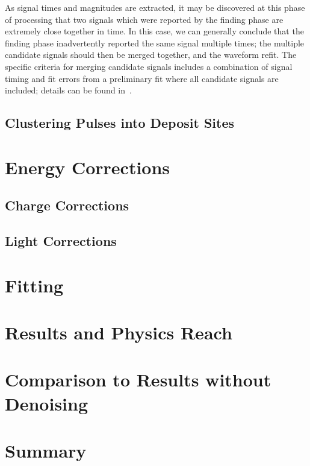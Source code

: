 As signal times and magnitudes are extracted, it may be discovered at this phase of processing that two signals which were reported by the finding phase are extremely close together in time.  In this case, we can generally conclude that the finding phase inadvertently reported the same signal multiple times; the multiple candidate signals should then be merged together, and the waveform refit.  The specific criteria for merging candidate signals includes a combination of signal timing and fit errors from a preliminary fit where all candidate signals are included; details can be found in~\cite{ReconstructionDocument}.

\subsection{Clustering Pulses into Deposit Sites}\label{sec:ReconClustering}


\section{Energy Corrections}\label{sec:ResultEnergy}

\subsection{Charge Corrections}\label{sec:ResultEnergyCharge}

\subsection{Light Corrections}\label{sec:ResultEnergyLight}

\section{Fitting}\label{sec:ResultFitting}

\section{Results and Physics Reach}\label{sec:ResultResults}

\section{Comparison to Results without Denoising}\label{sec:ResultComparison}

\section{Summary}\label{sec:ResultSummary}
